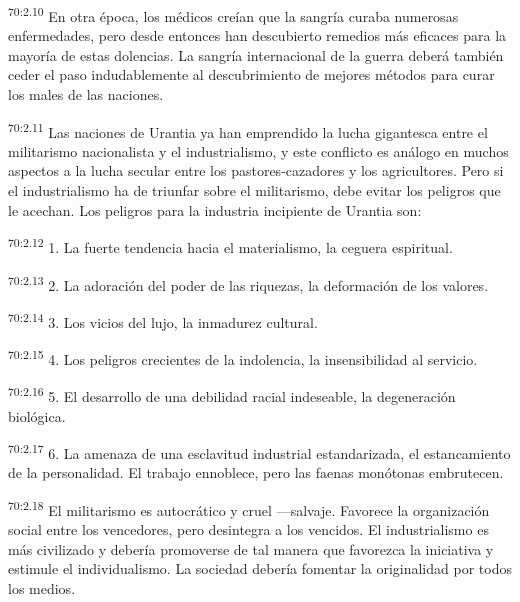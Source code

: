 \par
\textsuperscript{70:2.10} En otra época, los médicos creían que la sangría curaba numerosas enfermedades, pero desde entonces han descubierto remedios más eficaces para la mayoría de estas dolencias. La sangría internacional de la guerra deberá también ceder el paso indudablemente al descubrimiento de mejores métodos para curar los males de las naciones.

\par
\textsuperscript{70:2.11} Las naciones de Urantia ya han emprendido la lucha gigantesca entre el militarismo nacionalista y el industrialismo, y este conflicto es análogo en muchos aspectos a la lucha secular entre los pastores-cazadores y los agricultores. Pero si el industrialismo ha de triunfar sobre el militarismo, debe evitar los peligros que le acechan. Los peligros para la industria incipiente de Urantia son:

\par
\textsuperscript{70:2.12} 1. La fuerte tendencia hacia el materialismo, la ceguera espiritual.

\par
\textsuperscript{70:2.13} 2. La adoración del poder de las riquezas, la deformación de los valores.

\par
\textsuperscript{70:2.14} 3. Los vicios del lujo, la inmadurez cultural.

\par
\textsuperscript{70:2.15} 4. Los peligros crecientes de la indolencia, la insensibilidad al servicio.

\par
\textsuperscript{70:2.16} 5. El desarrollo de una debilidad racial indeseable, la degeneración biológica.

\par
\textsuperscript{70:2.17} 6. La amenaza de una esclavitud industrial estandarizada, el estancamiento de la personalidad. El trabajo ennoblece, pero las faenas monótonas embrutecen.

\par
\textsuperscript{70:2.18} El militarismo es autocrático y cruel ---salvaje. Favorece la organización social entre los vencedores, pero desintegra a los vencidos. El industrialismo es más civilizado y debería promoverse de tal manera que favorezca la iniciativa y estimule el individualismo. La sociedad debería fomentar la originalidad por todos los medios.

